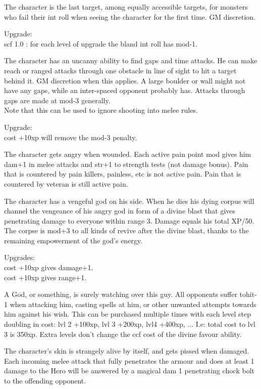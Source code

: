   The character is the last target, among equally accessible targets, for monsters who fail their int roll when seeing the character for the first time. GM discretion.

Upgrade:\\
scf 1.0 : for each level of upgrade the bland int roll has mod-1.


 The character has an uncanny ability to find gaps and time attacks. He can make reach or ranged attacks through one obstacle in line of sight to hit a target behind it. GM discretion when this applies. A large boulder or wall might not have any gaps, while an inter-spaced opponent probably has. Attacks through gaps are made at mod-3 generally. \\
Note that this can be used to ignore shooting into melee rules.

Upgrade: \\
cost +10xp will remove the mod-3 penalty.


 The character gets angry when wounded. Each active pain point mod gives him dam+1 in melee attacks and str+1 to strength tests (not damage bonus). Pain that is countered by pain killers, painless, etc is not active pain. Pain that is countered by veteran is still active pain.


 The character has a vengeful god on his side. When he dies his dying corpus will channel the vengeance of his angry god in form of a divine blast that gives penetrating damage to everyone within range 3. Damage equals his total XP/50. The corpse is mod+3 to all kinds of revive after the divine blast, thanks to the remaining empowerment of the god's energy.

Upgrades: \\
cost +10xp gives damage+1. \\
cost +10xp gives range+1.


 A God, or something, is surely watching over this guy. All opponents suffer tohit-1 when attacking him, casting spells at him, or other unwanted attempts towards him against his wish. This can be purchased multiple times with each level step doubling in cost: lvl 2 +100xp, lvl 3 +200xp, lvl4 +400xp, ... I.e: total cost to lvl 3 is 350xp. Extra levels don't change the ccf cost of the divine favour ability.


 The character's skin is strangely alive by itself, and gets pissed when damaged. Each incoming melee attack that fully penetrates the armour and does at least 1 damage to the Hero will be answered by a magical dam 1 penetrating chock bolt to the offending opponent.

